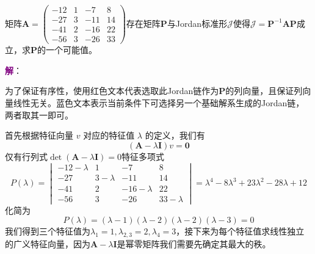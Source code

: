 \begin{example}
	矩阵$\mathbf{A}=\begin{pmatrix}
 -12 & 1 & -7 & 8\\
 -27 & 3 & -11 & 14\\
 -41 & 2 & -16 & 22\\
 -56 & 3 & -26 & 33
\end{pmatrix}$存在矩阵$\mathbf{P}$与Jordan标准形$\mathscr{J}$使得$\mathscr{J}=\mathbf{P}^{-1}\mathbf{A}\mathbf{P}$成立，求$\mathbf{P}$的一个可能值。

\tcblower
\textcolor{purple}{\textbf{解}}： 

为了保证有序性，使用红色文本代表选取此Jordan链作为$\mathbf{P}$的列向量，且保证列向量线性无关。蓝色文本表示当前条件下可选择另一个基础解系生成的Jordan链，两者取其一即可。

\vspace{1em}

首先根据特征向量 $v$ 对应的特征值 $\lambda$ 的定义，我们有$$(\mathbf{A}-\lambda\mathbf{I})v=\boldsymbol{0}$$仅有行列式$\det (\mathbf{A}-\lambda\mathbf{I})=0$特征多项式$$P(\lambda)=\begin{vmatrix}
 -12-\lambda  & 1 & -7 & 8\\
 -27 & 3-\lambda  & -11 & 14\\
 -41 & 2 & -16-\lambda  & 22\\
 -56 & 3 & -26 & 33-\lambda 
\end{vmatrix}=\lambda ^4-8\lambda^3+23\lambda^2-28\lambda+12$$化简为$$P(\lambda)=(\lambda-1)(\lambda-2)(\lambda-2)(\lambda-3)=0$$我们得到三个特征值为$\lambda_1=1,\lambda_{2,3}=2,\lambda_4=3$，接下来为每个特征值求线性独立的广义特征向量，因为$\mathbf{A}-\lambda\mathbf{I}$是幂零矩阵我们需要先确定其最大的秩。

\vspace{1em}


\end{example}

